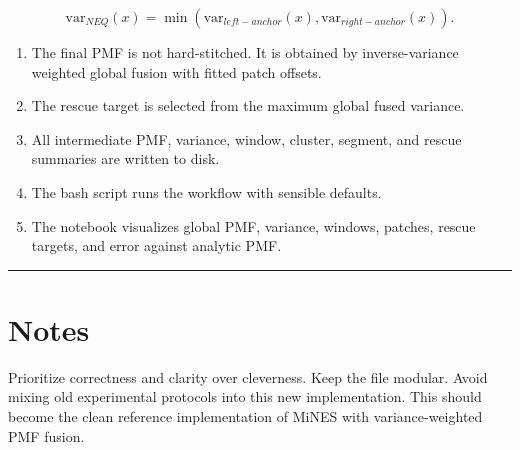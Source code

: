 \documentclass[
  10.5pt,
]{article}
\providecommand{\tightlist}{%
  \setlength{\itemsep}{0pt}\setlength{\parskip}{0pt}}
\begin{document}
\[
\mathrm{var}_{NEQ}(x)=\min(\mathrm{var}_{left-anchor}(x), \mathrm{var}_{right-anchor}(x)).
\]

\begin{enumerate}
\def\labelenumi{\arabic{enumi}.}
\setcounter{enumi}{9}
\tightlist
\item
  The final PMF is not hard-stitched. It is obtained by inverse-variance
  weighted global fusion with fitted patch offsets.
\item
  The rescue target is selected from the maximum global fused variance.
\item
  All intermediate PMF, variance, window, cluster, segment, and rescue
  summaries are written to disk.
\item
  The bash script runs the workflow with sensible defaults.
\item
  The notebook visualizes global PMF, variance, windows, patches, rescue
  targets, and error against analytic PMF.
\end{enumerate}

\begin{center}\rule{0.5\linewidth}{0.5pt}\end{center}

\section{Notes}\label{notes}

Prioritize correctness and clarity over cleverness. Keep the file
modular. Avoid mixing old experimental protocols into this new
implementation. This should become the clean reference implementation of
MiNES with variance-weighted PMF fusion.
\end{document}
